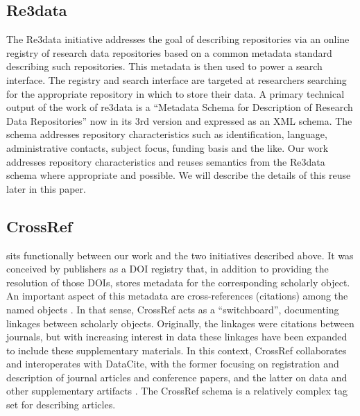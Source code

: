 \subsection{Re3data}
The Re3data initiative \parencite{Rucknagel2015,Re3data.Org2015} addresses the goal of describing repositories via an online registry of research data repositories based on a common metadata standard describing such repositories.
This metadata is then used to power a search interface.  The registry and search interface are targeted at researchers searching for the appropriate repository in which to store their data.
A primary technical output of the work of re3data is a ``Metadata Schema for Description of Research Data Repositories'' now in its 3rd version and expressed as an XML schema.  The schema addresses repository characteristics such as identification,   language, administrative contacts, subject focus, funding basis and the like.  Our work addresses repository characteristics and reuses semantics from the Re3data schema where appropriate and possible.  We will describe the details of this reuse later in this paper.

\subsection{CrossRef}
  sits functionally between our work and the two initiatives described above.  It was conceived by publishers as a DOI registry that, in addition to providing the resolution of those DOIs, stores metadata for the corresponding scholarly object.  An important aspect of this metadata are cross-references (citations) among the named objects \parencite{CrossRef}.  In that sense, CrossRef acts as a ``switchboard'', documenting linkages between scholarly objects. Originally, the linkages were citations between journals, but with increasing interest in data these linkages have been expanded to include these supplementary materials.  In this context, CrossRef collaborates and interoperates with DataCite, with the former focusing on registration and description of journal articles and conference papers, and the latter on data and other supplementary artifacts .  The CrossRef schema is a relatively complex tag set for describing articles.  

